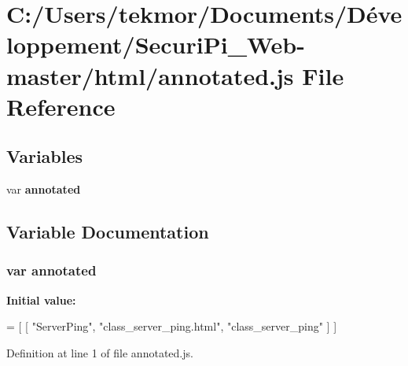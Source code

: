 \section{C\+:/\+Users/tekmor/\+Documents/\+Développement/\+Securi\+Pi\+\_\+\+Web-\/master/html/annotated.js File Reference}
\label{annotated_8js}
\subsection*{Variables}
\begin{DoxyCompactItemize}
\item 
var {\bf annotated}
\end{DoxyCompactItemize}


\subsection{Variable Documentation}
\subsubsection[{annotated}]{\setlength{\rightskip}{0pt plus 5cm}var annotated}\label{annotated_8js_a08934b3261f3e6180932d2001404c1bb}
{\bfseries Initial value\+:}
\begin{DoxyCode}
=
[
    [ \textcolor{stringliteral}{"ServerPing"}, \textcolor{stringliteral}{"class\_server\_ping.html"}, \textcolor{stringliteral}{"class\_server\_ping"} ]
]
\end{DoxyCode}


Definition at line 1 of file annotated.\+js.

